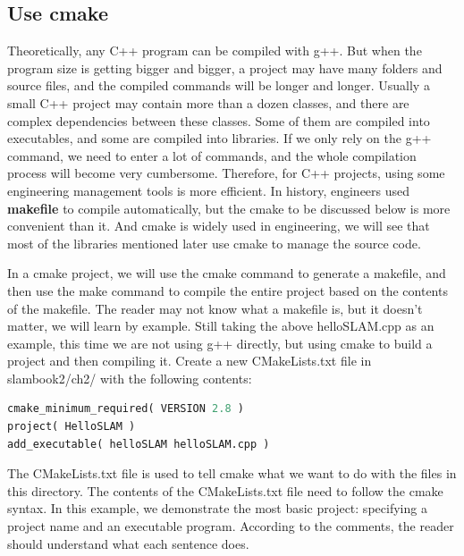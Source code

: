 \subsection{Use cmake}
Theoretically, any C++ program can be compiled with g++. But when the program size is getting bigger and bigger, a project may have many folders and source files, and the compiled commands will be longer and longer. Usually a small C++ project may contain more than a dozen classes, and there are complex dependencies between these classes. Some of them are compiled into executables, and some are compiled into libraries. If we only rely on the g++ command, we need to enter a lot of commands, and the whole compilation process will become very cumbersome. Therefore, for C++ projects, using some engineering management tools is more efficient. In history, engineers used \textbf{makefile} to compile automatically, but the cmake to be discussed below is more convenient than it. And cmake is widely used in engineering, we will see that most of the libraries mentioned later use cmake to manage the source code.

In a cmake project, we will use the cmake command to generate a makefile, and then use the make command to compile the entire project based on the contents of the makefile. The reader may not know what a makefile is, but it doesn't matter, we will learn by example. Still taking the above helloSLAM.cpp as an example, this time we are not using g++ directly, but using cmake to build a project and then compiling it. Create a new CMakeLists.txt file in slambook2/ch2/ with the following contents:
\begin{lstlisting}[language=Python,caption=slambook2/ch2/CMakeLists.txt]
cmake_minimum_required( VERSION 2.8 )
project( HelloSLAM )
add_executable( helloSLAM helloSLAM.cpp )
\end{lstlisting}

The CMakeLists.txt file is used to tell cmake what we want to do with the files in this directory. The contents of the CMakeLists.txt file need to follow the cmake syntax. In this example, we demonstrate the most basic project: specifying a project name and an executable program. According to the comments, the reader should understand what each sentence does.

